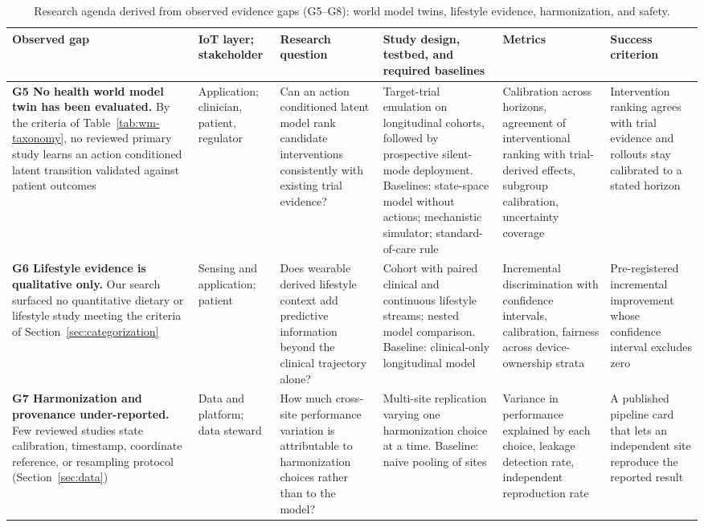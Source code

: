 \documentclass[journal]{IEEEtran}
\newif\ifsubmission
\begin{document}
\ifsubmission\else
\begin{table}[p]
\centering
\caption{Research agenda derived from observed evidence gaps (G5--G8): world model twins, lifestyle evidence, harmonization, and safety.}
\label{tab:agenda-b}
\scriptsize
\setlength{\tabcolsep}{3pt}
\renewcommand{\arraystretch}{1.12}
\begin{tabularx}{\textwidth}{>{\raggedright\arraybackslash}p{3.4cm} >{\raggedright\arraybackslash}p{1.9cm} >{\raggedright\arraybackslash}X >{\raggedright\arraybackslash}X >{\raggedright\arraybackslash}p{2.9cm} >{\raggedright\arraybackslash}p{3.0cm}}
\toprule
\textbf{Observed gap} & \textbf{IoT layer; stakeholder} & \textbf{Research question} & \textbf{Study design, testbed, and required baselines} & \textbf{Metrics} & \textbf{Success criterion} \\
\midrule
\textbf{G5 No health world model twin has been evaluated.} By the criteria of Table~\ref{tab:wm-taxonomy}, no reviewed primary study learns an action conditioned latent transition validated against patient outcomes & Application; clinician, patient, regulator & Can an action conditioned latent model rank candidate interventions consistently with existing trial evidence? & Target-trial emulation on longitudinal cohorts, followed by prospective silent-mode deployment. Baselines: state-space model without actions; mechanistic simulator; standard-of-care rule & Calibration across horizons, agreement of interventional ranking with trial-derived effects, subgroup calibration, uncertainty coverage & Intervention ranking agrees with trial evidence and rollouts stay calibrated to a stated horizon \\
\addlinespace[3pt]
\textbf{G6 Lifestyle evidence is qualitative only.} Our search surfaced no quantitative dietary or lifestyle study meeting the criteria of Section~\ref{sec:categorization} & Sensing and application; patient & Does wearable derived lifestyle context add predictive information beyond the clinical trajectory alone? & Cohort with paired clinical and continuous lifestyle streams; nested model comparison. Baseline: clinical-only longitudinal model & Incremental discrimination with confidence intervals, calibration, fairness across device-ownership strata & Pre-registered incremental improvement whose confidence interval excludes zero \\
\addlinespace[3pt]
\textbf{G7 Harmonization and provenance under-reported.} Few reviewed studies state calibration, timestamp, coordinate reference, or resampling protocol (Section~\ref{sec:data}) & Data and platform; data steward & How much cross-site performance variation is attributable to harmonization choices rather than to the model? & Multi-site replication varying one harmonization choice at a time. Baseline: naive pooling of sites & Variance in performance explained by each choice, leakage detection rate, independent reproduction rate & A published pipeline card that lets an independent site reproduce the reported result \\

\end{tabularx}
\end{table}
\end{document}
